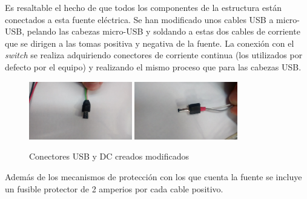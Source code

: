 \documentclass{article}
\begin{document}
Es resaltable el hecho de que todos los componentes de la estructura están conectados a esta fuente eléctrica. Se han modificado unos cables USB a micro-USB, pelando las cabezas micro-USB y soldando a estas dos cables de corriente que se dirigen a las tomas positiva y negativa de la fuente. La conexión con el \textit{switch} se realiza adquiriendo conectores de corriente continua (los utilizados por defecto por el equipo) y realizando el mismo proceso que para las cabezas USB.

\begin{figure}[H]
	\centering
	\includegraphics[width=0.4\textwidth]{fotos/usb}
	\includegraphics[width=0.4\textwidth]{fotos/dc}
	\caption{Conectores USB y DC creados modificados}
\end{figure}

Además de los mecanismos de protección con los que cuenta la fuente se incluye un fusible protector de 2 amperios por cada cable positivo.
\end{document}

